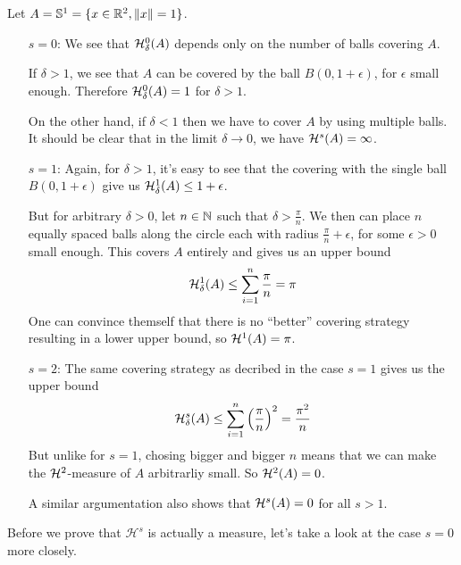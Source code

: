 \begin{ex}[]
  Let $A = \mathbb{S}^{1} = \{x \in \mathbb{R}^{2}, \|x\| = 1\}$.

  \begin{itemize}
    \item[$s = 0$:] We see that $\mathcal{H}_{\delta}^{0}(A)$ depends only on the number of balls covering $A$.

      If $\delta > 1$, we see that $A$ can be covered by the ball $B(0, 1 + \epsilon)$, for $\epsilon$ small enough.
      Therefore $\mathcal{H}_{\delta}^{0}(A) = 1$ for $\delta > 1$.

      On the other hand, if $\delta < 1$ then we have to cover $A$ by using multiple balls. 
      It should be clear that in the limit $\delta \to  0$, we have $\mathcal{H}^{s}(A) = \infty$.

    \item[$s = 1$:] Again, for $\delta > 1$, it's easy to see that the covering with the single ball $B(0,1 + \epsilon)$ give us $\Hau_{\delta}^{1}(A) \leq 1 + \epsilon$.

      But for arbitrary $\delta > 0$, let $n \in \mathbb{N}$ such that $\delta > \frac{\pi}{n}$.
      We then can place $n$ equally spaced balls along the circle each with radius $\frac{\pi}{n} + \epsilon$, for some $\epsilon> 0 $ small enough.
      This covers $A$ entirely and gives us an upper bound 
      \begin{align*}
        \mathcal{H}_{\delta}^{1}(A) \leq \sum_{i=1}^{n} \frac{\pi}{n} = \pi
      \end{align*}
      One can convince themself that there is no ``better'' covering strategy resulting in a lower upper bound, so $\mathcal{H}^{1}(A) = \pi$.

    \item[$s = 2$:] 
      The same covering strategy as decribed in the case $s = 1$ gives us the upper bound
      \begin{align*}
        \mathcal{H}_{\delta}^{s}(A) \leq \sum_{i=1}^{n} \left(\frac{\pi}{n}\right)^{2} = \frac{\pi^{2}}{n}
      \end{align*}
      But unlike for $s = 1$, chosing bigger and bigger $n$ means that we can make the $\mathcal{H}^{2}$-measure of $A$ arbitrarliy small.
      So $\mathcal{H}^{2}(A) = 0$.

      A similar argumentation also shows that $\mathcal{H}^{s}(A) = 0$ for all $s > 1$.
  \end{itemize}
\end{ex}

Before we prove that $\mathcal{H}^{s}$ is actually a measure, let's take a look at the case $s = 0$ more closely.

